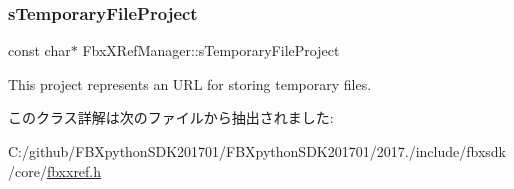\subsubsection{\texorpdfstring{s\+Temporary\+File\+Project}{sTemporaryFileProject}}
{\footnotesize\ttfamily const char$\ast$ Fbx\+X\+Ref\+Manager\+::s\+Temporary\+File\+Project\hspace{0.3cm}{\ttfamily [static]}}



This project represents an U\+RL for storing temporary files. 



このクラス詳解は次のファイルから抽出されました\+:\begin{DoxyCompactItemize}
\item 
C\+:/github/\+F\+B\+Xpython\+S\+D\+K201701/\+F\+B\+Xpython\+S\+D\+K201701/2017./include/fbxsdk/core/\hyperlink{fbxxref_8h}{fbxxref.\+h}\end{DoxyCompactItemize}
